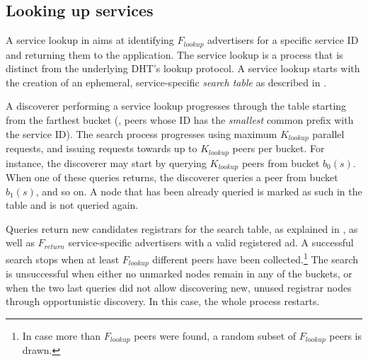 \subsection{Looking up services}
\label{sec:lookup}

A service lookup in \sysname aims at identifying $F_\textit{lookup}$ advertisers for a specific service ID and returning them to the application.
The service lookup is a process that is distinct from the underlying DHT's lookup protocol.
A service lookup starts with the creation of an ephemeral, service-specific \emph{search table} as described in .

A discoverer performing a service lookup progresses through the table starting from the farthest bucket (\ie, peers whose ID has the \emph{smallest} common prefix with the service ID).
The search process progresses using maximum $K_\textit{lookup}$ parallel requests, and issuing requests towards up to $K_\textit{lookup}$ peers per bucket.
For instance, the discoverer may start by querying $K_\textit{lookup}$ peers from bucket $b_0(s)$.
When one of these queries returns, the discoverer queries a peer from bucket $b_1(s)$, and so on.
A node that has been already queried is marked as such in the table and is not queried again.

Queries return new candidates registrars for the search table, as explained in , as well as $F_\textit{return}$ service-specific advertisers with a valid registered ad.
A successful search stops when at least $F_\textit{lookup}$ different peers have been collected.\footnote{In case more than $F_\textit{lookup}$ peers were found, a random subset of $F_\textit{lookup}$ peers is drawn.}
The search is unsuccessful when either no unmarked nodes remain in any of the buckets, or when the two last queries did not allow discovering new, unused registrar nodes through opportunistic discovery.
In this case, the whole process restarts.

